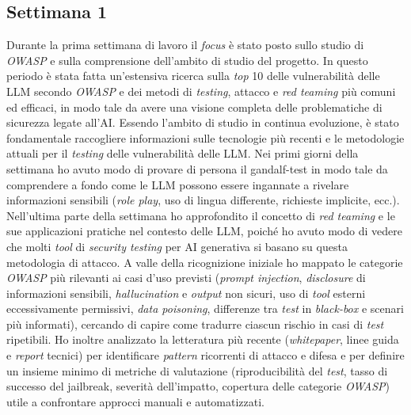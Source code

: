 \subsection{Settimana 1}
Durante la prima settimana di lavoro il \emph{focus} è stato posto sullo studio di \emph{OWASP} e sulla comprensione dell'ambito di studio del progetto. In questo periodo è stata fatta un'estensiva ricerca sulla \emph{top} 10 delle vulnerabilità delle LLM secondo \emph{OWASP} e dei metodi di \emph{testing}, attacco e \emph{red teaming} più comuni ed efficaci, in modo tale da avere una visione completa delle problematiche di sicurezza legate all'AI. Essendo l'ambito di studio in continua evoluzione, è stato fondamentale raccogliere informazioni sulle tecnologie più recenti e le metodologie attuali per il \emph{testing} delle vulnerabilità delle LLM. Nei primi giorni della settimana ho avuto modo di provare di persona il \gls{gandalf-test} in modo tale da comprendere a fondo come le LLM possono essere ingannate a rivelare informazioni sensibili (\emph{role play}, uso di lingua differente, richieste implicite, ecc.). Nell'ultima parte della settimana ho approfondito il concetto di \emph{red teaming} e le sue applicazioni pratiche nel contesto delle LLM, poiché ho avuto modo di vedere che molti \emph{tool} di \emph{security testing} per AI generativa si basano su questa metodologia di attacco. A valle della ricognizione iniziale ho mappato le categorie \emph{OWASP} più rilevanti ai casi d'uso previsti (\emph{prompt injection}, \emph{disclosure} di informazioni sensibili, \emph{hallucination} e \emph{output} non sicuri, uso di \emph{tool} esterni eccessivamente permissivi, \emph{data poisoning}, differenze tra \emph{test} in \emph{black-box} e scenari più informati), cercando di capire come tradurre ciascun rischio in casi di \emph{test} ripetibili. Ho inoltre analizzato la letteratura più recente (\emph{whitepaper}, linee guida e \emph{report} tecnici) per identificare \emph{pattern} ricorrenti di attacco e difesa e per definire un insieme minimo di metriche di valutazione (riproducibilità del \emph{test}, tasso di successo del \gls{jailbreak}\glsfirstoccur, severità dell'impatto, copertura delle categorie \emph{OWASP}) utile a confrontare approcci manuali e automatizzati.

